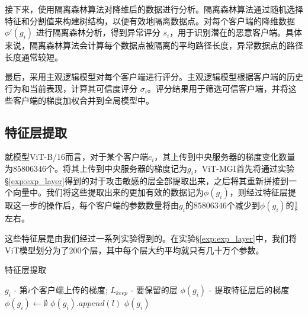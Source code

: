 \documentclass[conference]{IEEEtran}
\begin{document}
接下来，使用隔离森林算法对降维后的数据进行分析。隔离森林算法通过随机选择特征和分割值来构建树结构，以便有效地隔离数据点。对每个客户端的降维数据 $\phi'(g_i)$ 进行隔离森林分析，得到异常评分 $s_i$，用于识别潜在的恶意客户端。具体来说，隔离森林算法会计算每个数据点被隔离的平均路径长度，异常数据点的路径长度通常较短。

最后，采用主观逻辑模型对每个客户端进行评分。主观逻辑模型根据客户端的历史行为和当前表现，计算其可信度评分 $\sigma_i$。评分结果用于筛选可信客户端，并将这些客户端的梯度加权合并到全局模型中。

\subsection{特征层提取}
\label{sec:method_layer}

就模型ViT-B/16而言，对于某个客户端$c_i$，其上传到中央服务器的梯度变化数量为$85806346$个。将其上传到中央服务器的梯度记为$g_i$，ViT-MGI首先将通过实验\hyperref[exp:exp_layer]{§\ref{exp:exp_layer}}得到的对于攻击敏感的层全部提取出来，之后将其重新拼接到一个向量中。我们将这些提取出来的更加有效的数据记为$\phi(g_i)$，则经过特征层提取这一步的操作后，每个客户端的参数数量将由$g_i$的$85806346$个减少到$\phi(g_i)$的$\frac18$左右。

这些特征层是由我们经过一系列实验得到的。在实验\hyperref[exp:exp_layer]{§\ref{exp:exp_layer}}中，我们将ViT模型划分为了$200$个层，其中每个层大约平均就只有几十万个参数。


\begin{algorithm}
    \caption{特征层提取}
    \label{alg:example}
    \begin{algorithmic}[1]
        \Require $g_i$ - 第$i$个客户端上传的梯度; $L_{keep}$ - 要保留的层
        \Ensure $\phi(g_i)$ - 提取特征层后的梯度
            \State $\phi(g_i)\gets\emptyset$
                    \State $\phi(g_i).append(l)$
                \EndIf
            \EndFor
            \State \Return $\phi(g_i)$
        \EndFunction
    \end{algorithmic}
\end{algorithm}
\end{document}
